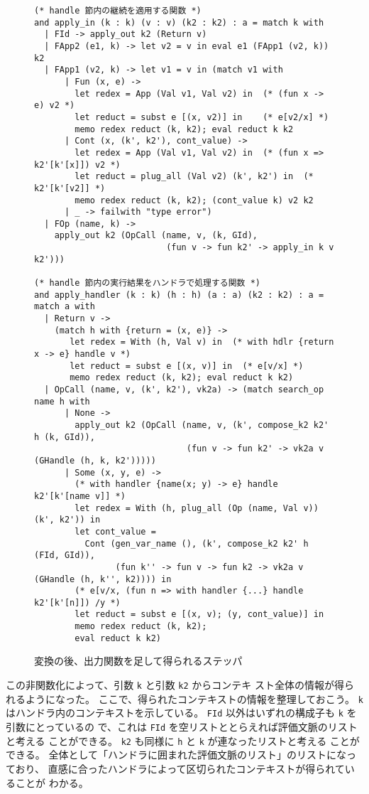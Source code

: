 \begin{figure}
\begin{verbatim}
(* handle 節内の継続を適用する関数 *)
and apply_in (k : k) (v : v) (k2 : k2) : a = match k with
  | FId -> apply_out k2 (Return v)
  | FApp2 (e1, k) -> let v2 = v in eval e1 (FApp1 (v2, k)) k2
  | FApp1 (v2, k) -> let v1 = v in (match v1 with
      | Fun (x, e) ->
        let redex = App (Val v1, Val v2) in  (* (fun x -> e) v2 *)
        let reduct = subst e [(x, v2)] in    (* e[v2/x] *)
        memo redex reduct (k, k2); eval reduct k k2
      | Cont (x, (k', k2'), cont_value) ->
        let redex = App (Val v1, Val v2) in  (* (fun x => k2'[k'[x]]) v2 *)
        let reduct = plug_all (Val v2) (k', k2') in  (* k2'[k'[v2]] *)
        memo redex reduct (k, k2); (cont_value k) v2 k2
      | _ -> failwith "type error")
  | FOp (name, k) ->
    apply_out k2 (OpCall (name, v, (k, GId),
                          (fun v -> fun k2' -> apply_in k v k2')))

(* handle 節内の実行結果をハンドラで処理する関数 *)
and apply_handler (k : k) (h : h) (a : a) (k2 : k2) : a = match a with
  | Return v ->
    (match h with {return = (x, e)} ->
       let redex = With (h, Val v) in  (* with hdlr {return x -> e} handle v *)
       let reduct = subst e [(x, v)] in  (* e[v/x] *)
       memo redex reduct (k, k2); eval reduct k k2)
  | OpCall (name, v, (k', k2'), vk2a) -> (match search_op name h with
      | None ->
        apply_out k2 (OpCall (name, v, (k', compose_k2 k2' h (k, GId)),
                              (fun v -> fun k2' -> vk2a v (GHandle (h, k, k2')))))
      | Some (x, y, e) ->
        (* with handler {name(x; y) -> e} handle k2'[k'[name v]] *)
        let redex = With (h, plug_all (Op (name, Val v)) (k', k2')) in
        let cont_value =
          Cont (gen_var_name (), (k', compose_k2 k2' h (FId, GId)),
                (fun k'' -> fun v -> fun k2 -> vk2a v (GHandle (h, k'', k2)))) in
        (* e[v/x, (fun n => with handler {...} handle k2'[k'[n]]) /y *)
        let reduct = subst e [(x, v); (y, cont_value)] in
        memo redex reduct (k, k2);
        eval reduct k k2)
\end{verbatim}
\caption{変換の後、出力関数を足して得られるステッパ}
\label{figure:5memo}
\end{figure}

この非関数化によって、引数 \texttt{k} と引数 \texttt{k2} からコンテキ
スト全体の情報が得られるようになった。
ここで、得られたコンテキストの情報を整理しておこう。
\texttt{k} はハンドラ内のコンテキストを示している。
\texttt{FId} 以外はいずれの構成子も \texttt{k} を引数にとっているの
で、これは \texttt{FId} を空リストととらえれば評価文脈のリストと考える
ことができる。
\texttt{k2} も同様に \texttt{h} と \texttt{k} が連なったリストと考える
ことができる。
全体として「ハンドラに囲まれた評価文脈のリスト」のリストになっており、
直感に合ったハンドラによって区切られたコンテキストが得られていることが
わかる。

